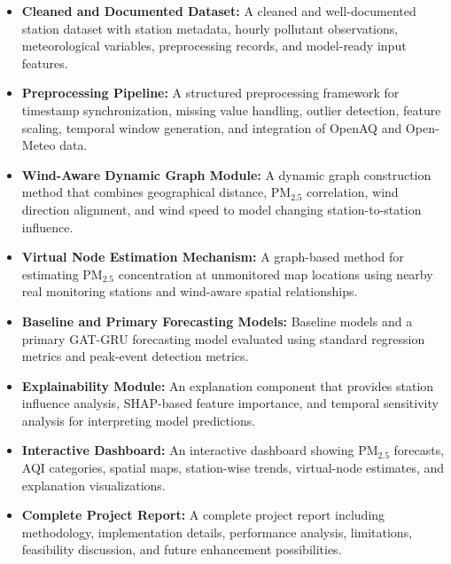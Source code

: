 \begin{itemize}
    \item \textbf{Cleaned and Documented Dataset:}  
    A cleaned and well-documented station dataset with station metadata, hourly pollutant observations, meteorological variables, preprocessing records, and model-ready input features.

    \item \textbf{Preprocessing Pipeline:}  
    A structured preprocessing framework for timestamp synchronization, missing value handling, outlier detection, feature scaling, temporal window generation, and integration of OpenAQ and Open-Meteo data.

    \item \textbf{Wind-Aware Dynamic Graph Module:}  
    A dynamic graph construction method that combines geographical distance, PM$_{2.5}$ correlation, wind direction alignment, and wind speed to model changing station-to-station influence.

    \item \textbf{Virtual Node Estimation Mechanism:}  
    A graph-based method for estimating PM$_{2.5}$ concentration at unmonitored map locations using nearby real monitoring stations and wind-aware spatial relationships.

    \item \textbf{Baseline and Primary Forecasting Models:}  
    Baseline models and a primary GAT-GRU forecasting model evaluated using standard regression metrics and peak-event detection metrics.

    \item \textbf{Explainability Module:}  
    An explanation component that provides station influence analysis, SHAP-based feature importance, and temporal sensitivity analysis for interpreting model predictions.

    \item \textbf{Interactive Dashboard:}  
    An interactive dashboard showing PM$_{2.5}$ forecasts, AQI categories, spatial maps, station-wise trends, virtual-node estimates, and explanation visualizations.

    \item \textbf{Complete Project Report:}  
    A complete project report including methodology, implementation details, performance analysis, limitations, feasibility discussion, and future enhancement possibilities.
\end{itemize}
